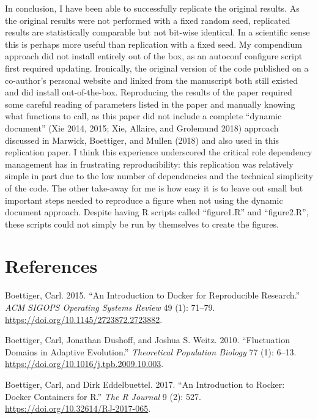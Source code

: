 \documentclass[
]{rescience}
\begin{document}
In conclusion, I have been able to successfully replicate the original
results. As the original results were not performed with a fixed random
seed, replicated results are statistically comparable but not bit-wise
identical. In a scientific sense this is perhaps more useful than
replication with a fixed seed. My compendium approach did not install
entirely out of the box, as an autoconf configure script first required
updating. Ironically, the original version of the code published on a
co-author's personal website and linked from the manuscript both still
existed and did install out-of-the-box. Reproducing the results of the
paper required some careful reading of parameters listed in the paper
and manually knowing what functions to call, as this paper did not
include a complete ``dynamic document'' (Xie 2014, 2015; Xie, Allaire,
and Grolemund 2018) approach discussed in Marwick, Boettiger, and Mullen
(2018) and also used in this replication paper. I think this experience
underscored the critical role dependency management has in frustrating
reproducibility: this replication was relatively simple in part due to
the low number of dependencies and the technical simplicity of the code.
The other take-away for me is how easy it is to leave out small but
important steps needed to reproduce a figure when not using the dynamic
document approach. Despite having R scripts called ``figure1.R'' and
``figure2.R'', these scripts could not simply be run by themselves to
create the figures.

\hypertarget{references}{%
\section*{References}\label{references}}

\hypertarget{refs}{}
\leavevmode\hypertarget{ref-Boettiger2015}{}%
Boettiger, Carl. 2015. ``An Introduction to Docker for Reproducible
Research.'' \emph{ACM SIGOPS Operating Systems Review} 49 (1): 71--79.
\url{https://doi.org/10.1145/2723872.2723882}.

\leavevmode\hypertarget{ref-Boettiger2010}{}%
Boettiger, Carl, Jonathan Dushoff, and Joshua S. Weitz. 2010.
``Fluctuation Domains in Adaptive Evolution.'' \emph{Theoretical
Population Biology} 77 (1): 6--13.
\url{https://doi.org/10.1016/j.tpb.2009.10.003}.

\leavevmode\hypertarget{ref-Boettiger2017}{}%
Boettiger, Carl, and Dirk Eddelbuettel. 2017. ``An Introduction to
Rocker: Docker Containers for R.'' \emph{The R Journal} 9 (2): 527.
\url{https://doi.org/10.32614/RJ-2017-065}.
\end{document}
